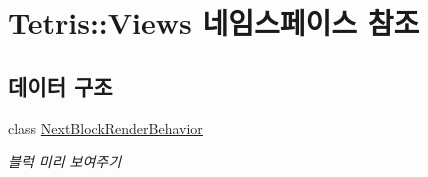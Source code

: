 \hypertarget{namespace_tetris_1_1_views}{}\section{Tetris\+:\+:Views 네임스페이스 참조}
\label{namespace_tetris_1_1_views}
\subsection*{데이터 구조}
\begin{DoxyCompactItemize}
\item 
class \hyperlink{class_tetris_1_1_views_1_1_next_block_render_behavior}{Next\+Block\+Render\+Behavior}
\begin{DoxyCompactList}\small\item\em 블럭 미리 보여주기 \end{DoxyCompactList}\end{DoxyCompactItemize}
